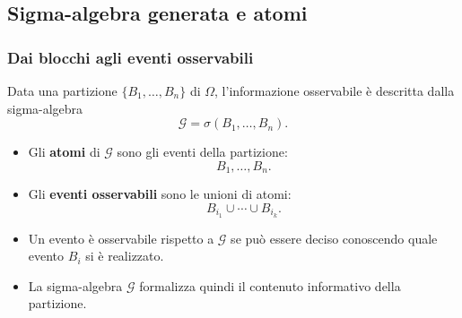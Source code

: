 \documentclass[handout]{beamer}%
\newenvironment{stepitemize}{\begin{itemize}[<+->]}{\end{itemize} }
\providecommand{\G}{\mathcal{G}}
\providecommand{\1}{\mathbf{1}}
\providecommand{\QTR}[2]{\csname #1\endcsname{#2}}
\begin{document}


\subsection{Sigma-algebra generata e atomi}%

\begin{frame}%
%

\frametitle{Dai blocchi agli eventi osservabili}%
%

%


Data una partizione $\{B_{1},\ldots,B_{n}\}$ di $\Omega$, l'informazione
osservabile \`{e} descritta dalla sigma-algebra
\[
\G=\sigma(B_{1},\ldots,B_{n}).
\]


\medskip

\begin{stepitemize}
\item Gli \textbf{atomi} di $\G$ sono gli eventi della partizione:
\[
B_{1},\ldots,B_{n}.
\]


\item Gli \textbf{eventi osservabili} sono le unioni di atomi:
\[
B_{i_{1}}\cup\cdots\cup B_{i_{k}}.
\]


\item Un evento \`{e} osservabile rispetto a $\G$ se pu\`{o} essere deciso
conoscendo quale evento $B_{i}$ si \`{e} realizzato.

\item La sigma-algebra $\G$ formalizza quindi il contenuto informativo della partizione.
\end{stepitemize}%

\transboxout
\end{frame}%


%
\end{document}
